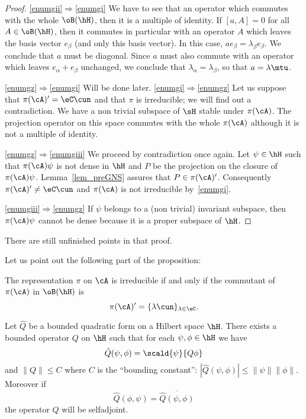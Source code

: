 \begin{proof}
\ref{enumgii}$\Rightarrow$\ref{enumgi}
We have to see that an operator which commutes with the whole $\oB(\hH)$, then it is a multiple of identity. If $[a,A]=0$ for all $A\in\oB(\hH)$, then it commutes in particular with an operator $A$ which leaves the basis vector $e_{\beta}$ (and only this basis vector). In this case, $ae_{\beta}=\lambda_{\beta}e_{\beta}$. We conclude that $a$ must be diagonal. Since $a$ must also commute with an operator which leaves $e_{\alpha}+e_{\beta}$ unchanged, we conclude that $\lambda_{\alpha}=\lambda_{\beta}$, so that $a=\lambda\mtu$.

\ref{enumgz}$\Rightarrow$\ref{enumgi} Will be done later.
\ref{enumgi}$\Rightarrow$\ref{enumgz} Let us suppose that $\pi(\cA)'=\eC\cun$ and that $\pi$ is irreducible; we will find out a contradiction. We have a non trivial subspace of $\sH$ stable under $\pi(\cA)$. The projection operator on this space commutes with the whole $\pi(\cA)$ although it is not a multiple of identity.

\ref{enumgz}$\Rightarrow$\ref{enumgiii} We proceed by contradiction once again.  Let $\psi\in\hH$ such that $\pi(\cA)\psi$ is not dense in $\hH$ and $P$ be the projection on the closure of $\pi(\cA)\psi$. Lemma~\ref{lem_preGNS} assures that $P\in\pi(\cA)'$. Consequently $\pi(\cA)'\neq \eC\cun$ and $\pi(\cA)$ is not irreducible by~\ref{enumgi}.

\ref{enumgiii}$\Rightarrow$\ref{enumgz} If $\psi$ belongs to a (non trivial) invariant subspace, then $\pi(\cA)\psi$ cannot be dense because it is a proper subspace of $\hH$.

\end{proof}

\begin{probleme}
    There are still unfinished points in that proof.
\end{probleme}


Let us point out the following part of the proposition:

\begin{lemma}
The representation $\pi$ on $\cA$ is irreducible if and only if the commutant of $\pi(\cA)$ in $\oB(\hH)$ is
 \[
  \pi(\cA)'=\{ \lambda\cun \}_{\lambda\in\eC}.
\]

\end{lemma}


\begin{lemma}
Let $\hat Q$ be a bounded quadratic form on a Hilbert space $\hH$. There exists a bounded operator $Q$ on $\hH$ such that for each $\psi,\phi\in\hH$ we have
\[
\hat Q(\psi,\phi)=\scald{ \psi}{Q\phi }
\]
 and $\| Q \|\leq C$ where $C$ is the ``bounding constant'': $| \hat Q(\psi,\phi) |\leq \| \psi \|\| \phi \|$.
Moreover if
%
\begin{equation}  \label{eq_r19032}
\hat Q(\phi,\psi)=\overline{ \hat Q(\psi,\phi) }
\end{equation}
 the operator $Q$ will be selfadjoint.
\label{lem_r19031}
\end{lemma}

